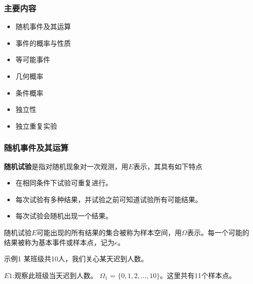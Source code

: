 \documentclass{beamer}
\begin{document}
	\begin{frame}
		\frametitle{主要内容}
		\begin{itemize}
			\item 随机事件及其运算
			\item 事件的概率与性质
			\item 等可能事件
			\item 几何概率
			\item 条件概率
			\item 独立性
			\item 独立重复实验
		\end{itemize}
	\end{frame}
	\begin{frame}
		\frametitle{随机事件及其运算}
		\textbf{随机试验}是指对随机现象对一次观测，用$E$表示，其具有如下特点
		\begin{itemize}
			\item 在相同条件下试验可重复进行。
			\item 每次试验有多种结果，并试验之前可知道试验所有可能结果。
			\item 每次试验会随机出现一个结果。
		\end{itemize}
		随机试验$E$可能出现的所有结果的集合被称为$\textbf{样本空间}$，用$\Omega$表示。每一个可能的结果被称为$\textbf{基本事件}$或$\textbf{样本点}$，记为$e$。
		
		\vspace{1cm}
		
		示例1 某班级共10人，我们关心某天迟到人数。
		
		$E1$:观察此班级当天迟到人数。
		$\Omega_1$ = $\{0, 1, 2, \dots, 10\}$。这里共有11个样本点。
	\end{frame}
	
\end{document}
